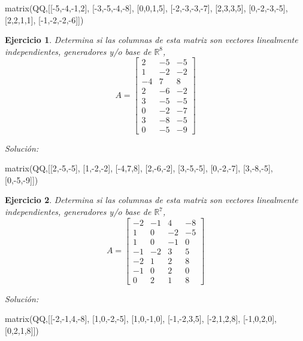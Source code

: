 \documentclass{amsart}
\newtheorem{ejer}{Ejercicio}
\begin{document}
\begin{sageblock}
matrix(QQ,[[-5,-4,-1,2],
[-3,-5,-4,-8],
[0,0,1,5],
[-2,-3,-3,-7],
[2,3,3,5],
[0,-2,-3,-5],
[2,2,1,1],
[-1,-2,-2,-6]])
\end{sageblock}



\begin{ejer} Determina si las columnas de esta matriz son vectores linealmente independientes, generadores y/o base de ${{\mathbb R}}^{8}$,
\[ A = \left[\begin{array}{rrr}
2 & -5 & -5 \\
1 & -2 & -2 \\
-4 & 7 & 8 \\
2 & -6 & -2 \\
3 & -5 & -5 \\
0 & -2 & -7 \\
3 & -8 & -5 \\
0 & -5 & -9
\end{array}\right] \]
\end{ejer}

{\it Soluci\'on:}

\begin{sageblock}
matrix(QQ,[[2,-5,-5],
[1,-2,-2],
[-4,7,8],
[2,-6,-2],
[3,-5,-5],
[0,-2,-7],
[3,-8,-5],
[0,-5,-9]])
\end{sageblock}



\begin{ejer} Determina si las columnas de esta matriz son vectores linealmente independientes, generadores y/o base de ${{\mathbb R}}^{7}$,
\[ A = \left[\begin{array}{rrrr}
-2 & -1 & 4 & -8 \\
1 & 0 & -2 & -5 \\
1 & 0 & -1 & 0 \\
-1 & -2 & 3 & 5 \\
-2 & 1 & 2 & 8 \\
-1 & 0 & 2 & 0 \\
0 & 2 & 1 & 8
\end{array}\right] \]
\end{ejer}

{\it Soluci\'on:}

\begin{sageblock}
matrix(QQ,[[-2,-1,4,-8],
[1,0,-2,-5],
[1,0,-1,0],
[-1,-2,3,5],
[-2,1,2,8],
[-1,0,2,0],
[0,2,1,8]])
\end{sageblock}
\end{document}
